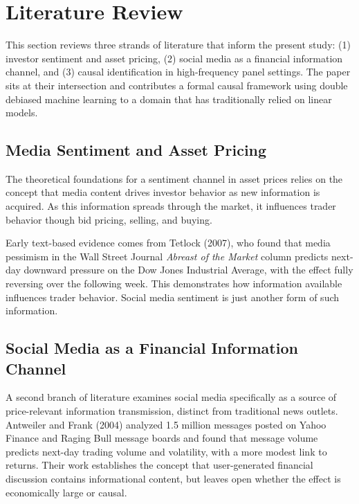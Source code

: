 \section{Literature Review}\label{literature-review}

This section reviews three strands of literature that inform the present
study: (1) investor sentiment and asset pricing, (2) social media as a
financial information channel, and (3) causal identification in
high-frequency panel settings. The paper sits at their intersection and
contributes a formal causal framework using double debiased machine
learning to a domain that has traditionally relied on linear models.

\subsection{Media Sentiment and Asset
Pricing}\label{media-sentiment-and-asset-pricing}

The theoretical foundations for a sentiment channel in asset prices
relies on the concept that media content drives investor behavior as new
information is acquired. As this information spreads through the market,
it influences trader behavior though bid pricing, selling, and buying.

Early text-based evidence comes from Tetlock (2007), who found that
media pessimism in the Wall Street Journal \emph{Abreast of the Market}
column predicts next-day downward pressure on the Dow Jones Industrial
Average, with the effect fully reversing over the following week. This
demonstrates how information available influences trader behavior.
Social media sentiment is just another form of such information.

\subsection{Social Media as a Financial Information
Channel}\label{social-media-as-a-financial-information-channel}

A second branch of literature examines social media specifically as a
source of price-relevant information transmission, distinct from
traditional news outlets. Antweiler and Frank (2004) analyzed
1.5 million messages posted on Yahoo Finance and Raging Bull message
boards and found that message volume predicts next-day trading volume
and volatility, with a more modest link to returns. Their work
establishes the concept that user-generated financial discussion
contains informational content, but leaves open whether the effect is
economically large or causal.

